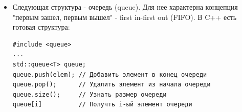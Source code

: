 \documentclass[a4paper,12pt]{article}
\begin{document}
\begin{itemize}
\begin{enumerate}
		            \begin{verbatim}
stack.push_back(x);
minsstack.push_back(std::min(minsstack.back(), |\ttfamily\uline{x}|));
\end{verbatim}
		            $stack = [5, 2]$; $minsstack = [5, 2]$

		      \item $x_3 = 3$. Текущий $x$ больше последнего элемента $minsstack$, значит добавляем не
		            $x$, а последний элемент $minsstack$, т.е. \uline{левую часть} std::min(...):

		            \begin{verbatim}
stack.push_back(x);
minsstack.push_back(std::min(|\ttfamily\uline{minsstack.back()}|, x));
\end{verbatim}
		            $stack = [5, 2, 3]$; $minsstack = [5, 2, 2]$

		      \item $x_4 = 4$. $x_4 > x_2$, значит в конец minsstack добавляем $x_2$.
		            $stack = [5, 2, 3, 4]$; $minsstack = [5, 2, 2, 2]$

		      \item $x_5 = 1$, $x_5 < x_2$, значит в конец minsstack добавляем $x_5$.
		            $stack = [5, 2, 3, 4, 1]$; $minsstack = [5, 2, 2, 2, 1]$
	      \end{enumerate}

	      Таким образом получается стек обычный и стек префиксных минимумов. Затем, если нам
	      нужно удалить последний элемент стека, мы просто удаляем его из обоих стеков:

	      \begin{verbatim}
stack.pop_back();
minsstack.pop_back();
\end{verbatim}

	\item Следующая структура - очередь (queue). Для нее характерна концепция "первым зашел,
	      первым вышел" - first in-first out (FIFO). В C++ есть готовая структура:
	      \begin{verbatim}
#include <queue>
...
std::queue<T> queue;
queue.push(elem); // Добавить элемент в конец очереди
queue.pop();      // Удалить элемент из начала очереди
queue.size();     // Узнать размер очереди
queue[i]          // Получть i-ый элемент очереди
\end{verbatim}


\end{itemize}
\end{document}
